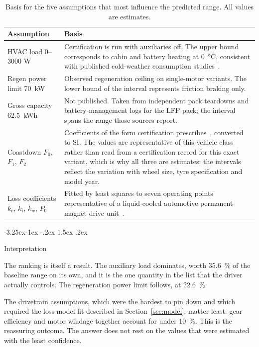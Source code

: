 \documentclass[twocolumn]{article}
\makeatletter
\newcommand{\asm}[1]{\textcolor{assumed}{#1}}
\renewcommand\subsection{\@startsection{subsection}{2}{\z@}%
  {-3.25ex\@plus -1ex \@minus -.2ex}%
  {1.5ex \@plus .2ex}%
  {\raggedright\normalfont\large\bfseries}}
\makeatother
\begin{document}
\begin{table}[H]
\centering
\caption{Basis for the five assumptions that most influence the predicted
range. All values are \asm{estimates}.}
\label{tab:basis}
\footnotesize
\begin{tabular}{@{}>{\raggedright\arraybackslash}p{}>{\raggedright\arraybackslash}p{}@{}}
\toprule
\textbf{Assumption} & \textbf{Basis} \\
\midrule
HVAC load \asm{0--3000 W} &
Certification is run with auxiliaries off. The upper bound corresponds to
cabin and battery heating at \SI{0}{\celsius}, consistent with published
cold-weather consumption studies~\cite{iora2019}. \\
\addlinespace
Regen power limit \asm{\SI{70}{\kilo\watt}} &
Observed regeneration ceiling on single-motor variants. The lower bound of the
interval represents friction braking only. \\
\addlinespace
Gross capacity \asm{\SI{62.5}{\kWh}} &
Not published. Taken from independent pack teardowns and battery-management
logs for the LFP pack; the interval spans the range those sources report. \\
\addlinespace
Coastdown $F_0$, $F_1$, $F_2$ &
Coefficients of the form certification prescribes~\cite{epacoastdown},
converted to SI. The values are representative of this vehicle class rather
than read from a certification record for this exact variant, which is why all
three are estimates; the intervals reflect the variation with wheel size, tyre
specification and model year. \\
\addlinespace
Loss coefficients $k_c$, $k_i$, $k_w$, $P_0$ &
Fitted by least squares to seven operating points representative of a
liquid-cooled automotive permanent-magnet drive unit~\cite{larminie2012,
sarlioglu2017}. \\
\bottomrule
\end{tabular}
\end{table}

\subsection{Interpretation}

The ranking is itself a result. The auxiliary load dominates, worth
\SI{35.6}{\percent} of the baseline range on its own, and it is the one
quantity in the list that the driver actually controls. The regeneration power
limit follows, at \SI{22.6}{\percent}.

The drivetrain assumptions, which were the hardest to pin down and which
required the loss-model fit described in Section~\ref{sec:model}, matter least:
gear efficiency and motor windage together account for under
\SI{10}{\percent}. This is the reassuring outcome. The answer does not rest on
the values that were estimated with the least confidence.
\end{document}
